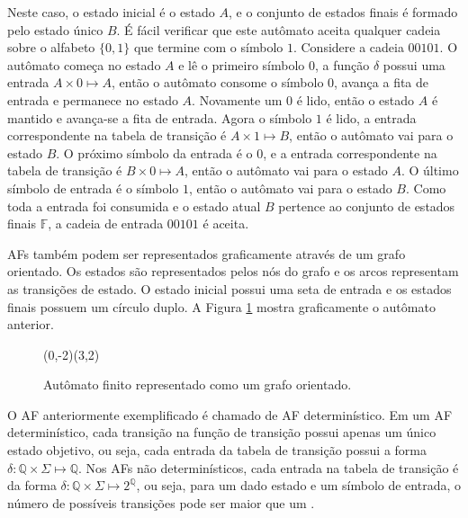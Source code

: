 \documentclass[12pt,a4paper]{article}
\let\vState=\origState
\begin{document}
Neste caso, o estado inicial é o estado $A$, e o conjunto de estados finais
é formado pelo estado único $B$. É fácil verificar que este autômato aceita
qualquer cadeia sobre o alfabeto $\{0,1\}$ que termine com o símbolo $1$.
Considere a cadeia $00101$. O autômato começa no estado $A$ e lê o primeiro
símbolo $0$, a função $\delta$ possui uma entrada $A \times 0 \mapsto A$,
então o autômato consome o símbolo $0$, avança a fita de entrada e permanece
no estado $A$. Novamente um $0$ é lido, então o estado $A$ é mantido e
avança-se a fita de entrada. Agora o símbolo $1$ é lido, a entrada correspondente
na tabela de transição é $A \times 1 \mapsto B$, então o autômato vai para
o estado $B$. O próximo símbolo da entrada é o $0$, e a entrada correspondente
na tabela de transição é $B \times 0 \mapsto A$, então o autômato vai para o
estado $A$. O último símbolo de entrada é o símbolo $1$, então o autômato vai
para o estado $B$. Como toda a entrada foi consumida e o estado atual $B$
pertence ao conjunto de estados finais $\mathbb{F}$, a cadeia de entrada $00101$ é
aceita.

AFs também podem ser representados graficamente através de
um grafo orientado. Os estados são representados pelos nós do grafo
e os arcos representam as transições de estado. O estado inicial possui
uma seta de entrada e os estados finais possuem um círculo duplo. A
Figura \ref{fig:automata} mostra graficamente o autômato anterior.

\begin{figure}[htp]
\begin{center}
\begin{VCPicture}{(0,-2)(3,2)}
\vState[A]{(0,0)}{A} 
 
 
\end{VCPicture}
\caption{Autômato finito representado como um grafo orientado.}
\label{fig:automata}
\end{center}
\end{figure}

O AF anteriormente exemplificado é chamado de AF determinístico.
Em um AF determinístico, cada transição na função de transição possui apenas
um único estado objetivo, ou seja, cada entrada da tabela de transição possui a forma
$\delta: \mathbb{Q} \times \Sigma \mapsto \mathbb{Q}$. Nos AFs não
determinísticos, cada entrada na tabela de transição é da forma
$\delta: \mathbb{Q} \times \Sigma \mapsto 2^{\mathbb{Q}}$,
ou seja, para um dado estado e um símbolo de entrada, o número de possíveis
transições pode ser maior que um .
\end{document}
